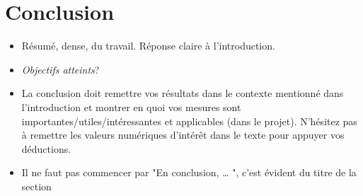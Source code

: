 \section{Conclusion}

\begin{itemize}
\item Résumé, dense, du travail. Réponse claire à l'introduction.
\item \textit{Objectifs atteints}?
\item La conclusion doit remettre vos résultats dans le contexte mentionné dans l'introduction et montrer en quoi vos mesures sont importantes/utiles/intéressantes et applicables (dans le projet). N'hésitez pas à remettre les valeurs numériques d'intérêt dans le texte pour appuyer vos déductions.
\item Il ne faut pas commencer par "En conclusion, … ", c'est évident du titre de la section
\end{itemize}